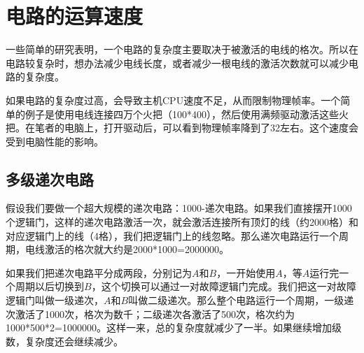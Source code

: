 \section{电路的运算速度}
一些简单的研究表明，一个电路的复杂度主要取决于被激活的电线的格次。所以在电路较复杂时，想办法减少电线长度，或者减少一根电线的激活次数就可以减少电路的复杂度。

如果电路的复杂度过高，会导致主机CPU速度不足，从而限制物理帧率。一个简单的例子是使用电线连接四万个火把（100*400），然后使用满频驱动激活这些火把。在笔者的电脑上，打开驱动后，可以看到物理帧率降到了32左右。这个速度会受到电脑性能的影响。

\subsection{多级递次电路}\label{sec5}
假设我们要做一个超大规模的递次电路：1000-递次电路。如果我们直接摆开1000个逻辑门，这样的递次电路激活一次，就会激活连接所有顶灯的线（约2000格）和对应逻辑门上的线（4格），我们把逻辑门上的线忽略。那么递次电路运行一个周期，电线激活的格次就大约是2000*1000=2000000。

如果我们把递次电路平分成两段，分别记为$A$和$B$，一开始使用$A$，等$A$运行完一个周期以后切换到$B$，这个切换可以通过一对故障逻辑门完成。我们把这一对故障逻辑门叫做一级递次，$A$和$B$叫做二级递次。那么整个电路运行一个周期，一级递次激活了1000次，格次为数千；二级递次各激活了500次，格次约为1000*500*2=1000000。这样一来，总的复杂度就减少了一半。如果继续增加级数，复杂度还会继续减少。

